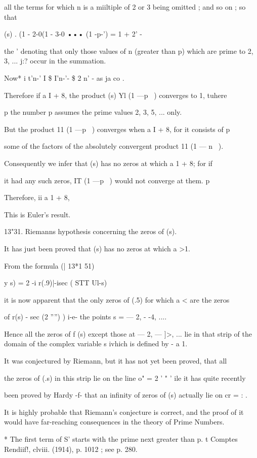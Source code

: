 all the terms for which n is a miiltiple of 2 or 3 being omitted ; and
so on ; so that

 (s) . (1 - 2-0(1 - 3-0 ••• (1 -p-') = 1 + 2' -

the ' denoting that only those values of n (greater than p) which are
prime to 2, 3, ... j:? occur in the summation.

Now* i t'n-' I \$ I'n-'- \$ 2 n' - as ja co .

Therefore if a I + 8, the product (s) Yl (1 —p~ ) converges to 1,
tuhere

p the number p assumes the prime values 2, 3, 5, ... only.

But the product 11 (1 —p~ ) converges when a I + 8, for it consists of
p

some of the factors of the absolutely convergent product 11 (1 — n~ ).

Consequently we infer that (s) has no zeros at which a 1 + 8; for if

it had any such zeros, IT (1 —p~ ) would not converge at them. p

Therefore, ii a 1 + 8,

This is Euler's result.

13"31. Riemanns hypothesis concerning the zeros of (s).

It has just been proved that (s) has no zeros at which a >1.

From the formula (| 13*1 51)

y s) = 2 -i r(.9)|-isec ( STT Ul-s)

it is now apparent that the only zeros of (.5) for which a < are the
zeros

of r(s) - sec (2 '''') ) i-e- the points s = — 2, - -4, ....

Hence all the zeros of f (s) except those at — 2, — ]>, ... lie in
that strip of the domain of the complex variable s ivhich is defined
by - a 1.

It was conjectured by Riemann, but it has not yet been proved, that
all

the zeros of (.s) in this strip lie on the line o" = 2 ' " ' ile it
has quite recently

been proved by Hardy -f- that an infinity of zeros of (s) actually lie
on cr = : .

It is highly probable that Riemann's conjecture is correct, and the
proof of it would have far-reaching consequences in the theory of
Prime Numbers.

* The first term of S' starts with the prime next greater than p. t
Comptes Rendiif!, clviii. (1914), p. 1012 ; see p. 280.

